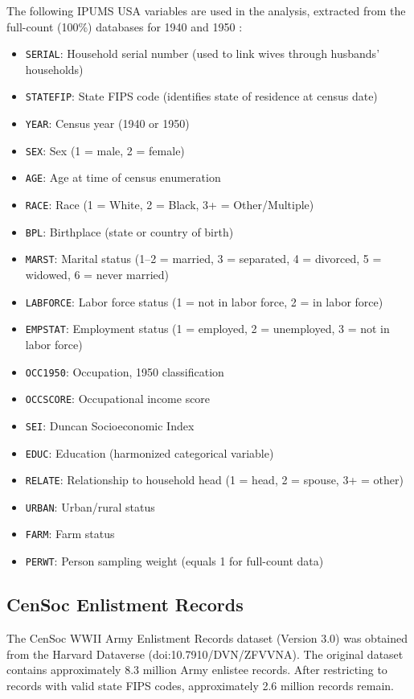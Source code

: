 \documentclass[12pt]{article}
\begin{document}
The following IPUMS USA variables are used in the analysis, extracted from the full-count (100\%) databases for 1940 and 1950 \citep{ruggles2024ipums}:

\begin{itemize}
\item \texttt{SERIAL}: Household serial number (used to link wives through husbands' households)
\item \texttt{STATEFIP}: State FIPS code (identifies state of residence at census date)
\item \texttt{YEAR}: Census year (1940 or 1950)
\item \texttt{SEX}: Sex (1 = male, 2 = female)
\item \texttt{AGE}: Age at time of census enumeration
\item \texttt{RACE}: Race (1 = White, 2 = Black, 3+ = Other/Multiple)
\item \texttt{BPL}: Birthplace (state or country of birth)
\item \texttt{MARST}: Marital status (1--2 = married, 3 = separated, 4 = divorced, 5 = widowed, 6 = never married)
\item \texttt{LABFORCE}: Labor force status (1 = not in labor force, 2 = in labor force)
\item \texttt{EMPSTAT}: Employment status (1 = employed, 2 = unemployed, 3 = not in labor force)
\item \texttt{OCC1950}: Occupation, 1950 classification
\item \texttt{OCCSCORE}: Occupational income score
\item \texttt{SEI}: Duncan Socioeconomic Index
\item \texttt{EDUC}: Education (harmonized categorical variable)
\item \texttt{RELATE}: Relationship to household head (1 = head, 2 = spouse, 3+ = other)
\item \texttt{URBAN}: Urban/rural status
\item \texttt{FARM}: Farm status
\item \texttt{PERWT}: Person sampling weight (equals 1 for full-count data)
\end{itemize}

\subsection{CenSoc Enlistment Records}

The CenSoc WWII Army Enlistment Records dataset (Version 3.0) was obtained from the Harvard Dataverse (doi:10.7910/DVN/ZFVVNA). The original dataset contains approximately 8.3 million Army enlistee records. After restricting to records with valid state FIPS codes, approximately 2.6 million records remain.
\end{document}
